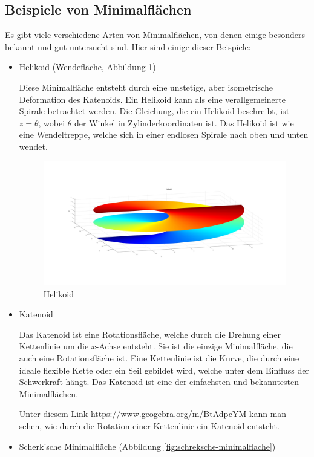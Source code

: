 \subsection{Beispiele von Minimalflächen
	\label{minimalflaechen:subsection:Beispiele von Minimalflächen}}
Es gibt viele verschiedene Arten von Minimalflächen, von denen einige besonders bekannt und gut untersucht sind.
Hier sind einige dieser Beispiele:
\begin{itemize}
	\item
	Helikoid (Wendefläche, Abbildung \ref{fig:helikoid})
	
	Diese Minimalfläche entsteht durch eine unstetige, aber isometrische Deformation des Katenoids.
	Ein Helikoid kann als eine verallgemeinerte Spirale betrachtet werden.
	Die Gleichung, die ein Helikoid beschreibt, ist $z=\theta$, wobei $\theta$ der Winkel in Zylinderkoordinaten ist.
	Das Helikoid ist wie eine Wendeltreppe, welche sich in einer endlosen Spirale nach oben und unten wendet.
\begin{figure}
	\centering
	\includegraphics[width=\textwidth]{papers/minimalflaechen/Helikoid}
	\caption{Helikoid}
	\label{fig:helikoid}
\end{figure}

	\item
	Katenoid
	
	Das Katenoid ist eine Rotationsfläche, welche durch die Drehung einer Kettenlinie um die $x$-Achse entsteht.
	Sie ist die einzige Minimalfläche, die auch eine Rotationsfläche ist.
	Eine Kettenlinie ist die Kurve, die durch eine ideale flexible Kette oder ein Seil gebildet wird, welche unter dem Einfluss der Schwerkraft hängt.
	Das Katenoid ist eine der einfachsten und bekanntesten Minimalflächen.
	
	Unter diesem Link \url{https://www.geogebra.org/m/BtAdpcYM} kann man sehen, wie durch die Rotation einer Kettenlinie ein Katenoid entsteht.
	\item
	Scherk'sche Minimalfläche (Abbildung \ref{fig:schreksche-minimalflache})
	

\end{itemize}
